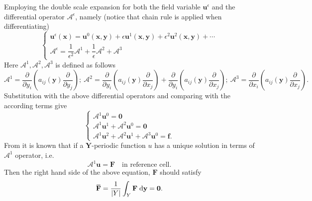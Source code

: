 \documentclass[10pt,a4paper]{scrreprt}
\newcommand{\myd}{\;\mathrm{d}}
\newcommand{\overbar}[1]{\mkern 1.5mu\overline{\mkern-1.5mu#1\mkern-1.5mu}\mkern 1.5mu}
\begin{document}
Employing the double scale expansion for both the field variable $\mathbf{u}^{\epsilon}$ and the differential operator $\mathcal{A}^{\epsilon}$, namely (notice that chain rule is applied when differentiating)
\begin{equation}
\left\{
\begin{array}{l}
\mathbf{u}^{\epsilon}(\mathbf{x}) = \mathbf{u}^{0}(\mathbf{x},\mathbf{y}) + \epsilon \mathbf{u}^{1}(\mathbf{x},\mathbf{y}) + \epsilon^{2} \mathbf{u}^{2}(\mathbf{x},\mathbf{y}) + \cdots \\
\mathcal{A}^{\epsilon} = \dfrac{1}{\epsilon^{2}} \mathcal{A}^{1} + \dfrac{1}{\epsilon} \mathcal{A}^{2} + \mathcal{A}^{3}
\end{array}
\right.
\end{equation}
Here $\mathcal{A}^{1}, \mathcal{A}^{2}, \mathcal{A}^{3}$ is defined as follows
\[
\mathcal{A}^{1} = \dfrac{\partial}{\partial y_{i}} \left( a_{ij}(\mathbf{y}) \dfrac{\partial}{\partial y_{j}} \right); \
\mathcal{A}^{2} = \dfrac{\partial}{\partial y_{i}} \left( a_{ij}(\mathbf{y}) \dfrac{\partial}{\partial x_{j}} \right) + \dfrac{\partial}{\partial y_{i}} \left( a_{ij}(\mathbf{y}) \dfrac{\partial}{\partial x_{j}} \right); \
\mathcal{A}^{3} = \dfrac{\partial}{\partial x_{i}} \left( a_{ij}(\mathbf{y}) \dfrac{\partial}{\partial x_{j}} \right).
\]
Substitution with the above differential operators and comparing with the according terms give
\begin{equation}
\label{eq: eq group}
\left\{
\begin{array}{l}
\mathcal{A}^{1} \mathbf{u}^{0} = \mathbf{0} \\
\mathcal{A}^{1} \mathbf{u}^{1} + \mathcal{A}^{2} \mathbf{u}^{0} = \mathbf{0} \\
\mathcal{A}^{1} \mathbf{u}^{2} + \mathcal{A}^{2} \mathbf{u}^{1} + \mathcal{A}^{3} \mathbf{u}^{0} = \mathbf{f}.
\end{array}
\right.
\end{equation}
From \citep{cioranescu_introduction_2000} it is known that if a $\mathbf{Y}$-periodic function $u$ has a unique solution in terms of $\mathcal{A}^{1}$ operator, i.e. 
\begin{equation}
\mathcal{A}^{1} \mathbf{u} = \mathbf{F} \quad \text{in reference cell}.
\end{equation}
Then the right hand side of the above equation, $\mathbf{F}$ should satisfy 
\begin{equation}
\overbar{\mathbf{F}} = \dfrac{1}{|Y|}\int_{Y} \mathbf{F} \myd{\mathbf{y}} = \mathbf{0}.
\end{equation}
\end{document}
